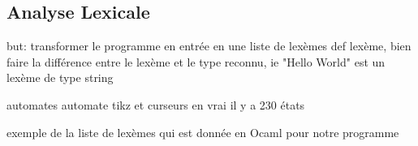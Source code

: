 \subsection{Analyse Lexicale}

\begin{frame}
    
    but: transformer le programme en entrée en une liste de lexèmes
    def lexème, bien faire la différence entre le lexème et le type reconnu, ie "Hello World" est un lexème de type string 

\end{frame}

\begin{frame}
    automates 
    automate tikz et curseurs 
    en vrai il y a 230 états
\end{frame}

\begin{frame}
    exemple de la liste de lexèmes qui est donnée en Ocaml pour notre programme

\end{frame}


